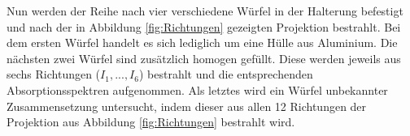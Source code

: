         Nun werden der Reihe nach vier verschiedene Würfel in der Halterung befestigt und nach der in Abbildung \ref{fig:Richtungen}
        gezeigten Projektion bestrahlt.
        Bei dem ersten Würfel handelt es sich lediglich um eine Hülle aus Aluminium.
        Die nächsten zwei Würfel sind zusätzlich homogen gefüllt.
        Diese werden jeweils aus sechs Richtungen ($I_1,...,I_6$) bestrahlt und
        die entsprechenden Absorptionsspektren aufgenommen.
        Als letztes wird ein Würfel unbekannter Zusammensetzung untersucht,
        indem dieser aus allen 12 Richtungen der Projektion aus Abbildung \ref{fig:Richtungen} bestrahlt wird.
          



